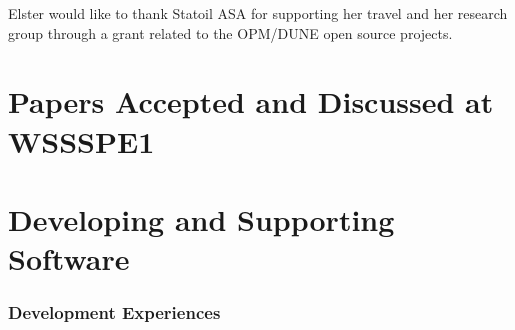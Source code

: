 \documentclass[11pt, oneside]{amsart}
\begin{document}
Elster would like to thank Statoil ASA for supporting her travel
and her research group through a grant related to the OPM/DUNE open source projects.



\appendix
\section{Papers Accepted and Discussed at WSSSPE1} \label{sec:papers}

\section*{Developing and Supporting Software}

\subsubsection*{Development Experiences}
\end{document}

